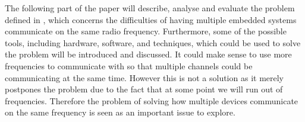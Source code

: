 \bigskip
The following part of the paper will describe, analyse and evaluate the problem defined in , which concerns the difficulties of having multiple embedded systems communicate on the same radio frequency.
Furthermore, some of the possible tools, including hardware, software, and techniques, which could be used to solve the problem will be introduced and discussed.
It could make sense to use more frequencies to communicate with so that multiple channels could be communicating at the same time.
However this is not a solution as it merely postpones the problem due to the fact that at some point we will run out of frequencies. 
Therefore the problem of solving how multiple devices communicate on the same frequency is seen as an important issue to explore.
